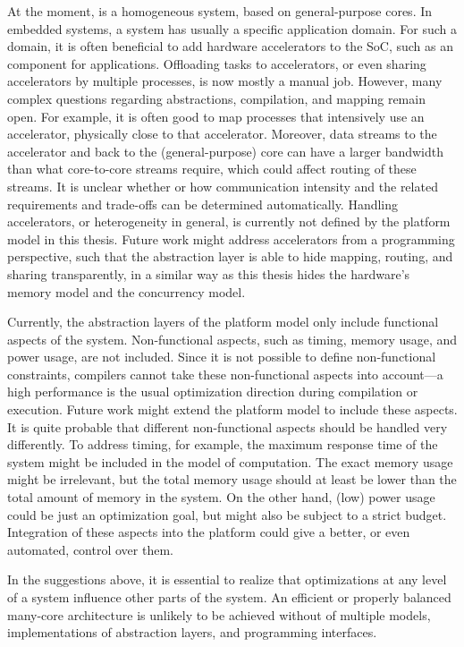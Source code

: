 At the moment, \Starburst is a homogeneous system, based on general-purpose cores.
In embedded systems, a system has usually a specific application domain.
For such a domain, it is often beneficial to add hardware accelerators to the \ac{SoC}, such as an  component for  applications.
Offloading tasks to accelerators, or even sharing accelerators by multiple processes, is now mostly a manual job.
However, many complex questions regarding abstractions, compilation, and mapping remain open.
For example, it is often good to map processes that intensively use an accelerator, physically close to that accelerator.
Moreover, data streams to the accelerator and back to the (general-purpose) core can have a larger bandwidth than what core-to-core streams require, which could affect routing of these streams.
It is unclear whether or how communication intensity and the related requirements and trade-offs can be determined automatically.
Handling accelerators, or heterogeneity in general, is currently not defined by the platform model in this thesis.
Future work might address accelerators from a programming perspective, such that the abstraction layer is able to hide mapping, routing, and sharing transparently, in a similar way as this thesis hides the hardware's memory model and the concurrency model.

Currently, the abstraction layers of the platform model only include functional aspects of the system.
Non-functional aspects, such as timing, memory usage, and power usage, are not included.
Since it is not possible to define non-functional constraints, compilers cannot take these non-functional aspects into account---a high performance is the usual optimization direction during compilation or execution.
Future work might extend the platform model to include these aspects.
It is quite probable that different non-functional aspects should be handled very differently.
To address timing, for example, the maximum response time of the system might be included in the model of computation.
The exact memory usage might be irrelevant, but the total memory usage should at least be lower than the total amount of memory in the system.
On the other hand, (low) power usage could be just an optimization goal, but might also be subject to a strict budget.
Integration of these aspects into the platform could give a better, or even automated, control over them.

In the suggestions above, it is essential to realize that optimizations at any level of a system influence other parts of the system.
An efficient or properly balanced many-core architecture is unlikely to be achieved without \codesign of multiple models, implementations of abstraction layers, and programming interfaces.

